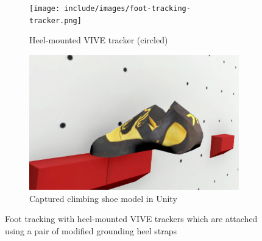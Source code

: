 \begin{figure}[ht]
    \centering
    \begin{subfigure}[t]{0.49\textwidth}
        \centering
		\texttt{[image: include/images/foot-tracking-tracker.png]}
		\caption{Heel-mounted VIVE tracker (circled)}
        \label{fig:foot-tracking-tracker}
    \end{subfigure}
    \hfill
    \begin{subfigure}[t]{0.49\textwidth}  
        \centering 
		\includegraphics[width=\textwidth]{include/images/foot-tracking-result.png}
		\caption{Captured climbing shoe model in Unity}
        \label{fig:foot-tracking-result}
    \end{subfigure}
    \caption[VIVE foot tracking]{Foot tracking with heel-mounted VIVE trackers which are attached using a pair of modified grounding heel straps}
    \label{fig:foot-tracking}
\end{figure}
